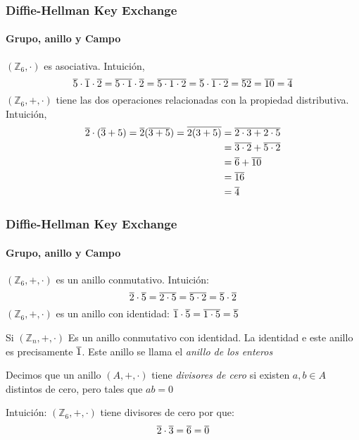 \documentclass[spanish, mexico]{beamer}
\begin{document}
	\begin{frame}
	    \frametitle{Diffie-Hellman Key Exchange}
		\framesubtitle{Grupo, anillo y Campo}
		$(\mathbb{Z}_6, \cdot)$ es asociativa. Intuición,
		$$
    		\overline{\rm 5} \cdot \overline{\rm 1} \cdot \overline{\rm 2} = \overline{\rm 5\cdot 1} \cdot \overline{\rm 2} = \overline{\rm 5 \cdot 1 \cdot 2} = \overline{\rm 5} \cdot \overline{\rm 1 \cdot 2} = \overline{\rm 5} \overline{\rm 2} = \overline{\rm 10} = \overline{\rm 4}
		$$
		$(\mathbb{Z}_6, +, \cdot)$ tiene las dos operaciones relacionadas con la propiedad distributiva. Intuición,
		\begin{align*}
		    \overline{\rm 2} \cdot (\overline{\rm 3} + 5) = \overline{\rm 2} (\overline{\rm 3 + 5}) = \overline{\rm 2(3+5)} &= \overline{\rm 2\cdot 3 + 2 \cdot 5}\\
		    &= \overline{\rm 3\cdot 2} + \overline{\rm 5 \cdot 2}\\
		    &= \overline{\rm 6} + \overline{\rm 10}\\
		    &= \overline{\rm 16}\\
		    &= \overline{\rm 4}
		\end{align*}
	\end{frame}
	
	\begin{frame}
	    \frametitle{Diffie-Hellman Key Exchange}
		\framesubtitle{Grupo, anillo y Campo}
	    $(\mathbb{Z}_6, +, \cdot)$ es un anillo conmutativo. Intuición:
	    $$\overline{\rm 2} \cdot \overline{\rm 5} = \overline{\rm 2 \cdot 5} = \overline{\rm 5 \cdot 2} = \overline{\rm 5} \cdot \overline{\rm 2}$$
	    $(\mathbb{Z}_6, +, \cdot)$ es un anillo con identidad:
	    $\overline{\rm 1} \cdot \overline{5} = \overline{1\cdot5} = \overline{5}$
	    \begin{definition}
	    Si $(\mathbb{Z}_n, +, \cdot)$ Es un anillo conmutativo con identidad. La identidad e este anillo es precisamente $\overline{\rm 1}$. Este anillo se llama el \textit{anillo de los enteros}
	    \end{definition}
	    \begin{definition}
	    Decimos que un anillo $(A, +, \cdot)$ tiene \textit{divisores de cero} si existen $a,b \in A$ distintos de cero, pero tales que $ab = 0$
	    \end{definition}
	    Intuición: $(\mathbb{Z}_6, +, \cdot)$ tiene divisores de cero por que:
	    $$\overline{\rm 2} \cdot \overline{\rm 3} = \overline{\rm 6} = \overline{\rm 0}$$
	\end{frame}
	
\end{document}
